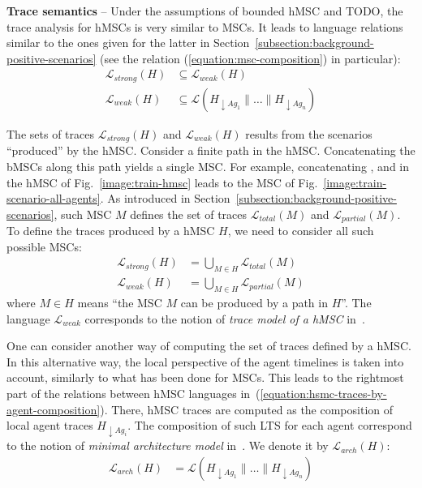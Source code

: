 \noindent \textbf{Trace semantics} -- Under the assumptions of bounded hMSC and TODO, the trace analysis for hMSCs is very similar to MSCs. It leads to language relations similar to the ones given for the latter in Section~\ref{subsection:background-positive-scenarios} (see the relation (\ref{equation:msc-composition}) in particular):
\begin{align}
\mathcal{L}_{strong}(H) & \subseteq \mathcal{L}_{weak}(H) \\
\mathcal{L}_{weak}(H) & \subseteq \mathcal{L}(H_{\downarrow Ag_1} \parallel \ldots \parallel H_{\downarrow Ag_n})
\label{equation:hsmc-traces-by-agent-composition}
\end{align}

The sets of traces $\mathcal{L}_{strong}(H)$ and $\mathcal{L}_{weak}(H)$ results from the scenarios ``produced'' by the hMSC. Consider a finite path in the hMSC. Concatenating the bMSCs along this path yields a single MSC. For example, concatenating ,  and  in the hMSC of Fig.~\ref{image:train-hmsc} leads to the MSC of Fig.~\ref{image:train-scenario-all-agents}. As introduced in Section~\ref{subsection:background-positive-scenarios}, such MSC $M$ defines the set of traces $\mathcal{L}_{total}(M)$ and $\mathcal{L}_{partial}(M)$. To define the traces produced by a hMSC $H$, we need to consider all such possible MSCs: 
\begin{align}
\mathcal{L}_{strong}(H) &= \bigcup_{M \in H} \mathcal{L}_{total}(M) \\
\mathcal{L}_{weak}(H) &= \bigcup_{M \in H} \mathcal{L}_{partial}(M)
\end{align}
\noindent where $M \in H$ means ``the MSC $M$ can be produced by a path in $H$''. The language $\mathcal{L}_{weak}$ corresponds to the notion of \emph{trace model of a hMSC} in~\cite{Uchitel:2004}.

One can consider another way of computing the set of traces defined by a hMSC. In this alternative way, the local perspective of the agent timelines is taken into account, similarly to what has been done for MSCs. This leads to the rightmost part of the relations between hMSC languages in~(\ref{equation:hsmc-traces-by-agent-composition}). There, hMSC traces are computed as the composition of local agent traces $H_{\downarrow Ag_i}$. The composition of such LTS for each agent correspond to the notion of \emph{minimal architecture model} in~\cite{Uchitel:2004}. We denote it by $\mathcal{L}_{arch}(H)$:
\begin{align}
\mathcal{L}_{arch}(H) &= \mathcal{L}(H_{\downarrow Ag_1} \parallel \ldots \parallel H_{\downarrow Ag_n})
\end{align}

